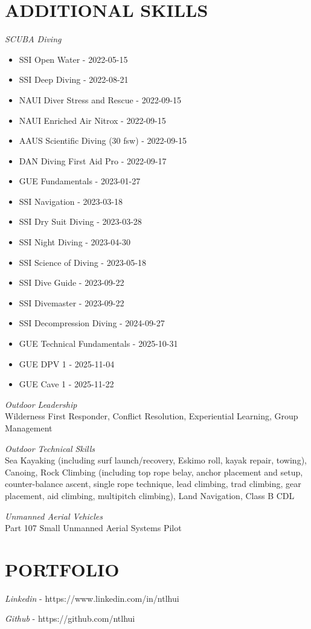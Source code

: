 \documentclass[line,margin]{res}
\begin{document}
\begin{resume}
\section{ADDITIONAL SKILLS}
	{\sl SCUBA Diving}\\
	    \begin{itemize}
			\item SSI Open Water - 2022-05-15
			\item SSI Deep Diving - 2022-08-21
			\item NAUI Diver Stress and Rescue - 2022-09-15
			\item NAUI Enriched Air Nitrox - 2022-09-15
			\item AAUS Scientific Diving (30 fsw) - 2022-09-15
			\item DAN Diving First Aid Pro - 2022-09-17
			\item GUE Fundamentals - 2023-01-27
			\item SSI Navigation - 2023-03-18
			\item SSI Dry Suit Diving - 2023-03-28
			\item SSI Night Diving - 2023-04-30
			\item SSI Science of Diving - 2023-05-18
			\item SSI Dive Guide - 2023-09-22
			\item SSI Divemaster - 2023-09-22
			\item SSI Decompression Diving - 2024-09-27
			\item GUE Technical Fundamentals - 2025-10-31
			\item GUE DPV 1 - 2025-11-04
			\item GUE Cave 1 - 2025-11-22
		\end{itemize}

	{\sl Outdoor Leadership}\\
		Wilderness First Responder, Conflict Resolution, Experiential Learning, Group Management

	{\sl Outdoor Technical Skills}\\
		Sea Kayaking (including surf launch/recovery, Eskimo roll, kayak repair, towing), Canoing, Rock Climbing (including top rope belay, anchor placement and setup, counter-balance ascent, single rope technique, lead climbing, trad climbing, gear placement, aid climbing, multipitch climbing), Land Navigation, Class B CDL

	{\sl Unmanned Aerial Vehicles}\\
		Part 107 Small Unmanned Aerial Systems Pilot

\section{PORTFOLIO}
	{\sl Linkedin} - https://www.linkedin.com/in/ntlhui

	{\sl Github} - https://github.com/ntlhui
\end{resume}
\end{document}
